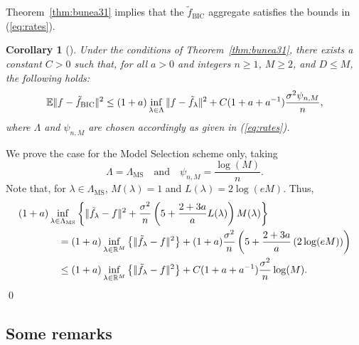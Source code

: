 \documentclass[11pt, letter paper]{article}
\newcommand{\1}{\mathmybb{1}}
\newtheorem{corollary}[proposition]{Corollary}
\newcommand{\R}{\mathbb{R}}
\newcommand{\0}{\emptyset}
\newcommand{\E}{\mathbb{E}}
\newcommand{\paren}[1]{\left(#1 \right)}
\newcommand{\set}[1]{\left\{ #1 \right\}}
\newcommand{\norm}[1]{|\hspace{-1pt}|#1 |\hspace{-1pt}|}
\newcommand{\normsq}[1]{\norm{#1}^{2}}
\newcommand{\ftilde}[1]{\tilde{f}_{#1}}
\begin{document}
Theorem~\ref{thm:bunea31} implies that the \(\ftilde{\mathrm{BIC}}\) aggregate satisfies the bounds in (\ref{eq:rates}).

\begin{corollary}[\cite{bunea_2007}]\label{cor:bounds}
    Under the conditions of Theorem~\ref{thm:bunea31}, there exists a constant \(C>0\) such that, for all \(a>0\) and integers \(n\geq 1\), \(M\geq 2\), and \(D\leq M\), the following holds:
    \[\E\normsq{f - \ftilde{\mathrm{BIC}}}\leq (1+a)\inf_{\lambda\in\Lambda}\normsq{f - \ftilde{\lambda}} + C(1+a+a^{-1})\frac{\sigma^{2}\psi_{n,M}}{n},\]
    where \(\Lambda\) and \(\psi_{n,M}\) are chosen accordingly as given in (\ref{eq:rates}).
\end{corollary}

\begin{myproofbox}
    We prove the case for the Model Selection scheme only, taking
    \[\Lambda = \Lambda_{\mathrm{MS}}\quad\text{and}\quad\psi_{n,M}=\frac{\log(M)}{n}.\]
    Note that, for \(\lambda\in\Lambda_{\mathrm{MS}}\), \(M(\lambda)=1\) and \(L(\lambda) = 2\log(eM)\). Thus,
    \begin{align*}
        &(1+a)\inf_{\lambda\in\Lambda_{\mathrm{MS}}}\set{\normsq{\ftilde{\lambda} - f} + \frac{\sigma^{2}}{n}\paren{5+\frac{2+3a}{a}{L(\lambda)}}M(\lambda)}\\
        &\qquad\qquad= (1+a)\inf_{\lambda\in\R^{M}}\set{\normsq{\ftilde{\lambda} - f}} + (1+a)\frac{\sigma^{2}}{n}\paren{5+\frac{2+3a}{a}\paren{2\log(eM)}}\\
        &\qquad\qquad\leq (1+a)\inf_{\lambda\in\R^{M}}\set{\normsq{\ftilde{\lambda} - f}} + C(1+a+a^{-1})\frac{\sigma^{2}}{n}\log(M).
    \end{align*}
    \qed{}
\end{myproofbox}

\subsection{Some remarks}
\end{document}
